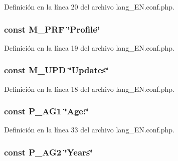 Definición en la línea 20 del archivo lang\-\_\-\-E\-N.\-conf.\-php.

\hypertarget{lang__EN_8conf_8php_acc375524bbf44b4d19de33e33c37b987}{
\subsubsection[{M\-\_\-\-P\-R\-F}]{\setlength{\rightskip}{0pt plus 5cm}const M\-\_\-\-P\-R\-F \char`\"{}Profile\char`\"{}}}\label{lang__EN_8conf_8php_acc375524bbf44b4d19de33e33c37b987}


Definición en la línea 19 del archivo lang\-\_\-\-E\-N.\-conf.\-php.

\hypertarget{lang__EN_8conf_8php_aa05f4b68a1c61dd74d97c3a7c79f1efd}{
\subsubsection[{M\-\_\-\-U\-P\-D}]{\setlength{\rightskip}{0pt plus 5cm}const M\-\_\-\-U\-P\-D \char`\"{}Updates\char`\"{}}}\label{lang__EN_8conf_8php_aa05f4b68a1c61dd74d97c3a7c79f1efd}


Definición en la línea 18 del archivo lang\-\_\-\-E\-N.\-conf.\-php.

\hypertarget{lang__EN_8conf_8php_af6b35f13bb73067e81a911449cb0b89b}{
\subsubsection[{P\-\_\-\-A\-G1}]{\setlength{\rightskip}{0pt plus 5cm}const P\-\_\-\-A\-G1 \char`\"{}Age\-:\char`\"{}}}\label{lang__EN_8conf_8php_af6b35f13bb73067e81a911449cb0b89b}


Definición en la línea 33 del archivo lang\-\_\-\-E\-N.\-conf.\-php.

\hypertarget{lang__EN_8conf_8php_ae0a798c192c8f5a02ae9e12a5ff20c68}{
\subsubsection[{P\-\_\-\-A\-G2}]{\setlength{\rightskip}{0pt plus 5cm}const P\-\_\-\-A\-G2 \char`\"{}Years\char`\"{}}}\label{lang__EN_8conf_8php_ae0a798c192c8f5a02ae9e12a5ff20c68}


